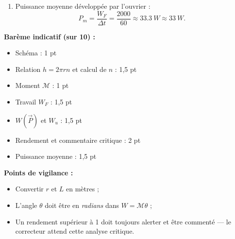 \documentclass[11pt]{article}
\begin{document}
\begin{corrige}
\begin{enumerate}
\item Puissance moyenne développée par l'ouvrier :
\[ P_m = \dfrac{W_F}{\Delta t} = \dfrac{2000}{60} \approx \SI{33,3}{W} \approx \SI{33}{W}. \]
\end{enumerate}
\textbf{Barème indicatif (sur 10) :}
\begin{itemize}
\item Schéma : 1 pt
\item Relation $h = 2\pi r n$ et calcul de $n$ : 1,5 pt
\item Moment $\mathcal{M}$ : 1 pt
\item Travail $W_F$ : 1,5 pt
\item $W(\vec{P})$ et $W_u$ : 1,5 pt
\item Rendement et commentaire critique : 2 pt
\item Puissance moyenne : 1,5 pt
\end{itemize}
\textbf{Points de vigilance :}
\begin{itemize}
\item Convertir $r$ et $L$ en mètres ;
\item L'angle $\theta$ doit être en \emph{radians} dans $W = \mathcal{M}\theta$ ;
\item Un rendement supérieur à 1 doit toujours alerter et être commenté — le correcteur attend cette analyse critique.
\end{itemize}
\end{corrige}
\end{document}
